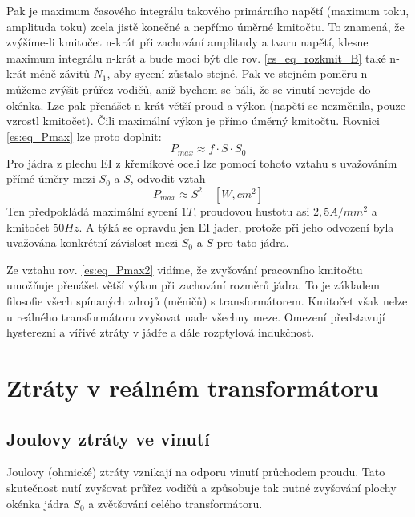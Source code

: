 {      Pak je maximum časového integrálu takového primárního napětí (maximum toku, amplituda toku) 
      zcela jistě konečné a nepřímo úměrné kmitočtu. To znamená, že zvýšíme-li kmitočet n-krát při 
      zachování amplitudy a tvaru napětí, klesne maximum integrálu n-krát a bude moci být dle rov. 
      \ref{es_eq_rozkmit_B} také n-krát méně závitů $N_1$, aby sycení zůstalo stejné. Pak ve 
      stejném poměru n můžeme zvýšit průřez vodičů, aniž bychom se báli, že se vinutí nevejde do 
      okénka. Lze pak přenášet n-krát větší proud a výkon (napětí se nezměnila, pouze vzrostl 
      kmitočet). Čili maximální výkon je přímo úměrný kmitočtu. Rovnici \ref{es:eq_Pmax} lze proto 
      doplnit:
      \begin{equation}\label{es:eq_Pmax2}
        P_{max} \approx f\cdot S\cdot S_0
      \end{equation}
      Pro jádra z plechu EI z křemíkové oceli lze pomocí tohoto vztahu s uvažováním přímé úměry 
      mezi $S_0$ a $S$, odvodit vztah
      \begin{equation}\label{es:eq_Pmax_EI}
        P_{max} \approx S^2\quad [W, cm^2]
      \end{equation}
      Ten předpokládá maximální sycení $1 T$, proudovou hustotu asi $2,5 A/mm^2$ a kmitočet $50 
      Hz$. A týká se opravdu jen EI jader, protože při jeho odvození byla uvažována konkrétní 
      závislost mezi $S_0$ a $S$ pro tato jádra.

      Ze vztahu rov. \ref{es:eq_Pmax2} vidíme, že zvyšování pracovního kmitočtu umožňuje přenášet 
      větší výkon při zachování rozměrů jádra. To je základem filosofie všech spínaných zdrojů 
      (měničů) s transformátorem. Kmitočet však nelze u reálného transformátoru zvyšovat nade 
      všechny meze. Omezení představují hysterezní a vířivé ztráty v jádře a dále rozptylová 
      indukčnost.

  \section{Ztráty v reálném transformátoru}
    \subsection{Joulovy ztráty ve vinutí}
      Joulovy (ohmické) ztráty vznikají na odporu vinutí průchodem proudu. Tato sku\-te\-čnost nutí 
      zvyšovat průřez vodičů a způsobuje tak nutné zvyšování plochy okénka jádra $S_0$ a zvětšování 
      celého transformátoru.

}
